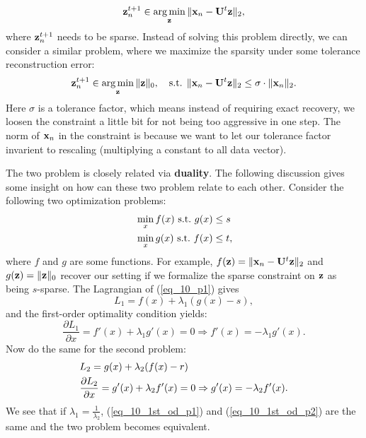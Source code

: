 \documentclass[../main.tex]{subfiles}
\begin{document}
\begin{equation*}
{\bf z}_n^{t+1}\in \mathop{\arg\min}_{\bf z}\|{\bf x}_n-{\bf U}^t {\bf z}\|_2,
\end{equation*}
where ${\bf z}_n^{t+1}$ needs to be sparse. Instead of solving this problem directly, we can consider a similar problem, where we maximize the sparsity under some tolerance reconstruction error:
\begin{equation}\label{eq_10_coding_pblm}
{\bf z}_n^{t+1} \in \mathop{\arg\min}_{\bf z} \|{\bf z}\|_0,\quad \text{s.t. }\|{\bf x}_n-{\bf U}^t {\bf z}\|_2\leq \sigma\cdot \|{\bf x}_n\|_2.
\end{equation}
Here $\sigma$ is a tolerance factor, which means instead of requiring exact recovery, we loosen the constraint a little bit for not being too aggressive in one step. The norm of ${\bf x}_n$ in the constraint is because we want to let our tolerance factor invarient to rescaling (multiplying a constant to all data vector). 
\par The two problem is closely related via \textbf{duality}. The following discussion gives some insight on how can these two problem relate to each other. Consider the following two optimization problems:
\begin{align}
\label{eq_10_p1}&\min_x f(x)\ {\rm s.t.}\ g(x)\leq s\\
\label{eq_10_p2}&\min_x g(x)\ {\rm s.t.}\ f(x)\leq t,
\end{align}
where $f$ and $g$ are some functions. For example, $f({\bf z}) = \|{\bf x}_n-{\bf U}^t {\bf z}\|_2$ and $g({\bf z}) = \|{\bf z}\|_0$ recover our setting if we formalize the sparse constraint on ${\bf z}$ as being $s$-sparse.
The Lagrangian of (\ref{eq_10_p1}) gives
\begin{equation*}
L_1 = f(x)+\lambda_1(g(x)-s),
\end{equation*}
and the first-order optimality condition yields:
\begin{equation}\label{eq_10_1st_od_p1}
\frac{\partial L_1}{\partial x}=f'(x)+\lambda_1g'(x)=0\Rightarrow f'(x)=-\lambda_1g'(x).
\end{equation}
Now do the same for the second problem:
\begin{align}
&L_2 = g(x)+\lambda_2(f(x)-r)\notag \\
\label{eq_10_1st_od_p2}&\frac{\partial L_2}{\partial x}=g'(x)+\lambda_2f'(x)=0\Rightarrow g'(x)=-\lambda_2f'(x).
\end{align}
We see that if $\lambda_1=\frac{1}{\lambda_2}$, (\ref{eq_10_1st_od_p1}) and (\ref{eq_10_1st_od_p2}) are the same and the two problem becomes equivalent. 
\end{document}
